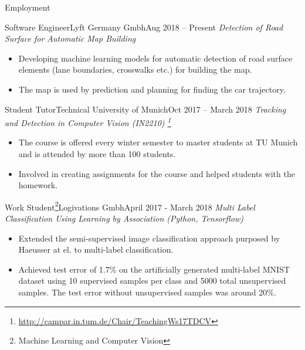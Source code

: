 \documentclass[]{mcdowellcv}
\begin{document}
    \begin{cvsection}{Employment}

            \begin{cvsubsection}{Software Engineer}{Lyft Germany Gmbh}{Aug 2018 -- Present}    
        \textit{Detection of Road Surface for Automatic Map Building}
            \begin{itemize}
                \item Developing machine learning models for automatic detection of road surface elements (lane boundaries, crosswalks etc.) for building the map. 
                \item The map is used by prediction and planning for finding the car trajectory.
            \end{itemize}
        \end{cvsubsection}
    
            \begin{cvsubsection}{Student Tutor}{Technical University of Munich}{Oct 2017 -- March 2018}    
        \textit{Tracking and Detection in Computer Vision (IN2210) \footnote{\href{http://campar.in.tum.de/Chair/TeachingWs17TDCV}{http://campar.in.tum.de/Chair/TeachingWs17TDCV}}}
            \begin{itemize}
                \item The course is offered every winter semester to master students at TU Munich and is attended by more than 100 students. 
                \item Involved in creating assignments for the course and helped students with the homework. 
            \end{itemize}
        \end{cvsubsection}
    
        \begin{cvsubsection}{Work Student\footnote{Machine Learning and Computer Vision\label{ws}}}{Logivations Gmbh}{April 2017 - March 2018}
            \textit{Multi Label Classification Using Learning by Association (Python, Tensorflow)}
            \begin{itemize}
                \item Extended the semi-supervised image classification approach purposed by Haeusser at el. \cite{haeusser-cvpr-17} to multi-label classification.
                \item Achieved test error of 1.7\% on the artificially generated multi-label MNIST dataset using 10 supervised samples per class and 5000 total unsupervised samples. The test error without unsupervised samples was around 20\%.
            \end{itemize}
                

\end{cvsubsection}
\end{cvsection}
\end{document}
